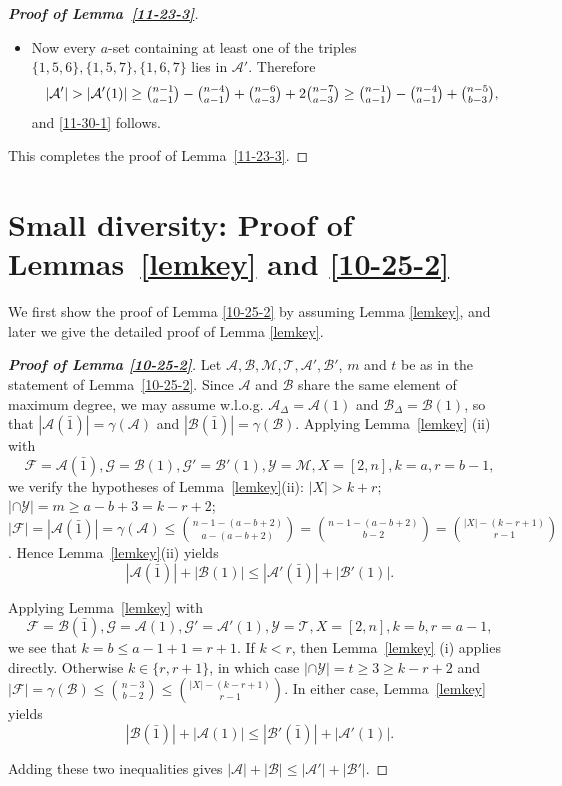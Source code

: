 \documentclass[11pt]{article}
\newcommand{\m}{\mathcal}
\begin{document}
\begin{proof}[{\bf Proof of Lemma~\ref{11-23-3}}]
\begin{itemize}
\item[($\ell\ge 3$).] 
Now every $a$-set containing at least one of the triples
$\{1,5,6\},\{1,5,7\},\{1,6,7\}$ lies in $\mathcal{A}'$. 
Therefore
$$
|\mathcal{A}'|
   > |\mathcal{A}'(1)|
   \ge \tbinom{n-1}{a-1} - \tbinom{n-4}{a-1} 
        + \tbinom{n-6}{a-3} + 2\tbinom{n-7}{a-3}
   \ge \tbinom{n-1}{a-1} - \tbinom{n-4}{a-1} + \tbinom{n-5}{b-3},
$$
and \eqref{11-30-1} follows.
\end{itemize}
This completes the proof of Lemma~\ref{11-23-3}.
\end{proof}





\section{Small diversity: Proof of Lemmas~\ref{lemkey} and \ref{10-25-2}}\label{secsmall}

We first show the proof of Lemma \ref{10-25-2} by assuming Lemma \ref{lemkey}, and later we give the detailed  proof of Lemma \ref{lemkey}. 


\begin{proof}[{\bf Proof of Lemma \ref{10-25-2}}]
Let $\mathcal{A}, \mathcal{B}, \mathcal{M}, \mathcal{T}, \mathcal{A}', \mathcal{B}'$, $m$ and $t$ be as in the statement of Lemma~\ref{10-25-2}.
Since $\m A$ and $\m B$ share the same element of maximum degree, we may assume
w.l.o.g. $\m A_\Delta = \m A(1)$ and $\m B_\Delta = \m B(1)$, so that $|\m A(\bar1)|=\gamma(\m A)$ and $|\m B(\bar1)|=\gamma(\m B)$.
Applying Lemma~\ref{lemkey} (ii) with
\[
\m F=\m A(\bar 1), \m G= \m B(1), \m G'=\m B'(1), \m Y=\m M, X=[2,n], k=a, r=b-1, 
\]
we verify the hypotheses of Lemma~\ref{lemkey}(ii): $|X|>k+r$; $|\cap \m Y|=m\ge a-b+3= k-r+2$; $|\m F|=|\m A(\bar1)|=\gamma(\m A)\le{n-1-(a-b+2)\choose a-(a-b+2)}= {n-1-(a-b+2)\choose b-2}={|X|-(k-r+1)\choose r-1}$. 
Hence Lemma~\ref{lemkey}(ii) yields
$$|\m A(\bar 1)|+|\m B(1)|\le |\m A'(\bar 1)|+|\m B'(1)|.$$

Applying Lemma~\ref{lemkey} with
\[
\m F=\m B(\bar 1), \m G= \m A(1), \m G'=\m A'(1), \m Y=\m T, X=[2,n], k=b, r=a-1, 
\]
we see that $k=b\le a-1+1= r+1$. 
If $k<r$, then Lemma~\ref{lemkey} (i) applies directly. Otherwise $k\in \{r,r+1\}$, in which case $|\cap\m Y|=t\ge 3 \ge k-r+2$ and $|\m F|=\gamma(\m B)\le {n-3\choose b-2}\le {|X|-(k-r+1)\choose r-1}$. In either case, Lemma~\ref{lemkey} yields  
$$|\m B(\bar 1)|+|\m A(1)|\le |\m B'(\bar 1)|+|\m A'(1)|.$$

Adding these two inequalities gives $|\m A|+|\m B|\le |\m A'|+|\m B'|$.
\end{proof}
\end{document}
